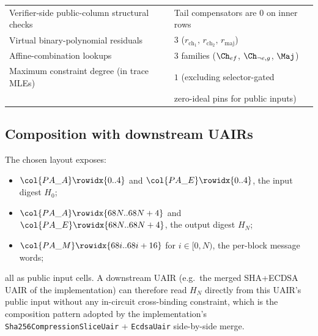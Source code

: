 \begin{center}
\begin{tabular}{ll}
Verifier-side public-column structural checks & Tail compensators are $0$ on inner rows \\
Virtual binary-polynomial residuals & $3$ \quad ($r_{\mathrm{ch}_1},\,r_{\mathrm{ch}_2},\,r_{\mathrm{maj}}$) \\
Affine-combination lookups        & $3$ families ($\Ch_{ef}$, $\Ch_{\neg e,g}$, $\Maj$) \\
\midrule
Maximum constraint degree (in trace MLEs) & $1$ \quad (excluding selector-gated\\ &\quad zero-ideal pins for public inputs) \\
\bottomrule
\end{tabular}
\end{center}


\subsection{Composition with downstream UAIRs}

The chosen layout exposes:
\begin{itemize}
\item $\col{PA\_A}\rowidx{0..4}$ and $\col{PA\_E}\rowidx{0..4}$, the
input digest $H_0$;
\item $\col{PA\_A}\rowidx{68N..68N+4}$ and $\col{PA\_E}\rowidx{68N..68N+4}$,
the output digest $H_N$;
\item $\col{PA\_M}\rowidx{68i..68i+16}$ for $i \in [0,N)$, the per-block
message words;
\end{itemize}
all as public input cells. A downstream UAIR (e.g.\ the merged
SHA+ECDSA UAIR of the implementation) can therefore read $H_N$
directly from this UAIR's public input without any in-circuit
cross-binding constraint, which is the composition pattern adopted by
the implementation's \texttt{Sha256CompressionSliceUair} +
\texttt{EcdsaUair} side-by-side merge.
